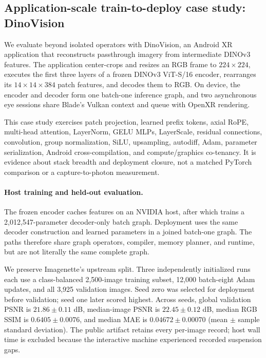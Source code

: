 
\subsection{Application-scale train-to-deploy case study: DinoVision}
\label{sec:dinovision}

We evaluate \system{} beyond isolated operators with DinoVision, an Android XR
application that reconstructs passthrough imagery from intermediate
DINOv3~\cite{simeoni2025dinov3} features. The application center-crops and
resizes an RGB frame to $224\times224$, executes the first three layers of a
frozen DINOv3 ViT-S/16 encoder, rearranges its
$14\times14\times384$ patch features, and decodes them to RGB. On device, the
encoder and decoder form one batch-one inference graph, and two asynchronous
eye sessions share Blade's Vulkan context and queue with OpenXR rendering.

This case study exercises patch projection, learned prefix tokens, axial RoPE,
multi-head attention, LayerNorm, GELU MLPs, LayerScale, residual connections,
convolution, group normalization, SiLU, upsampling, autodiff, Adam, parameter
serialization, Android cross-compilation, and compute/graphics co-tenancy. It
is evidence about stack breadth and deployment closure, not a matched PyTorch
comparison or a capture-to-photon measurement.

\paragraph{Host training and held-out evaluation.}
The frozen encoder caches features on an NVIDIA host, after which \system{}
trains a 2,012,547-parameter decoder-only batch graph. Deployment uses the same
decoder construction and learned parameters in a joined batch-one graph. The
paths therefore share graph operators, compiler, memory planner, and runtime,
but are not literally the same complete graph.

We preserve Imagenette's upstream split. Three independently initialized
runs each use a class-balanced 2,500-image training subset, 12,000 batch-eight
Adam updates, and all 3,925 validation images. Seed zero was selected for
deployment before validation; seed one later scored highest. Across seeds,
global validation PSNR is $21.86\pm0.11$ dB, median-image PSNR is
$22.45\pm0.12$ dB, median RGB SSIM is $0.6405\pm0.0076$, and median MAE is
$0.04672\pm0.00070$ (mean $\pm$ sample standard deviation). The public
artifact retains every per-image record; host wall time is excluded because
the interactive machine experienced recorded suspension gaps.

